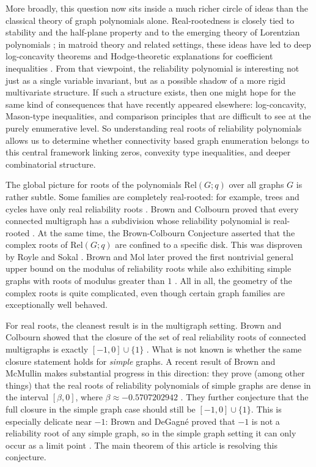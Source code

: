 \documentclass[12pt]{amsart}
\theoremstyle{definition}
\newcommand{\R}{\text{Rel}}
\begin{document}
More broadly, this question now sits inside a much richer circle of ideas than the classical theory of graph polynomials alone. Real-rootedness is closely tied to stability and the half-plane property \cite{ChoeOxleySokalWagner2004} and to the emerging theory of Lorentzian polynomials \cite{BrandenHuh2020}; in matroid theory and related settings, these ideas have led to deep log-concavity theorems and Hodge-theoretic explanations for coefficient inequalities \cite{AdiprasitoHuhKatz2018,Huh2015}. From that viewpoint, the reliability polynomial is interesting not just as a single variable invariant, but as a possible shadow of a more rigid multivariate structure. If such a structure exists, then one might hope for the same kind of consequences that have recently appeared elsewhere: log-concavity, Mason-type inequalities, and comparison principles that are difficult to see at the purely enumerative level. So understanding real roots of reliability polynomials allows us to determine whether connectivity based graph enumeration belongs to this central framework linking zeros, convexity type inequalities, and deeper combinatorial structure.

The global picture for roots of the polynomials $\R(G;q)$ over all graphs $G$ is rather subtle. Some families are completely real-rooted: for example, trees and cycles have only real reliability roots \cite{Colbourn1987}. Brown and Colbourn proved that every connected multigraph has a subdivision whose reliability polynomial is real-rooted \cite{BrownColbourn1992}. At the same time, the Brown-Colbourn Conjecture asserted that the complex roots of $\R(G;q)$ are confined to a specific disk. This was disproven by Royle and Sokal \cite{RoyleSokal2004}. Brown and Mol later proved the first nontrivial general upper bound on the modulus of reliability roots while also exhibiting simple graphs with roots of modulus greater than $1$ \cite{BrownMol2017}. All in all, the geometry of the complex roots is quite complicated, even though certain graph families are exceptionally well behaved.

For real roots, the cleanest result is in the multigraph setting. Brown and Colbourn showed that the closure of the set of real reliability roots of connected multigraphs is exactly $[-1,0]\cup\{1\}$ \cite{BrownColbourn1992}. What is not known is whether the same closure statement holds for \emph{simple} graphs. A recent result of Brown and McMullin makes substantial progress in this direction: they prove (among other things) that the real roots of reliability polynomials of simple graphs are dense in the interval $[\beta,0]$, where $\beta \approx -0.5707202942$ \cite{BrownMcMullin2026}. They further conjecture that the full closure in the simple graph case should still be $[-1,0]\cup\{1\}$. This is especially delicate near $-1$: Brown and DeGagn\'e proved that $-1$ is not a reliability root of any simple graph, so in the simple graph setting it can only occur as a limit point \cite{BrownDeGagne2020}. The main theorem of this article is resolving this conjecture.
\end{document}
